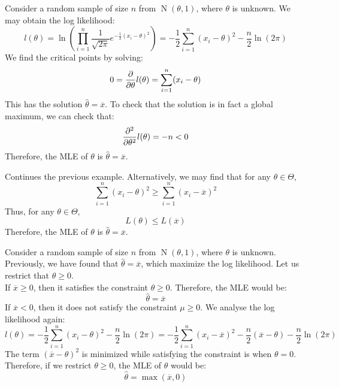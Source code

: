 \documentclass{huhtakm-template-book-v2}
\DeclareMathOperator{\N}{N}
\begin{document}
\newpage
\begin{eg}
	Consider a random sample of size $n$ from $\N(\theta,1)$, where $\theta$ is unknown. We may obtain the log likelihood:
	\begin{equation*}
		l(\theta)=\ln\left(\prod_{i=1}^{n}\frac{1}{\sqrt{2\pi}}e^{-\frac{1}{2}(x_{i}-\theta)^{2}}\right)=-\frac{1}{2}\sum_{i=1}^{n}(x_{i}-\theta)^{2}-\frac{n}{2}\ln(2\pi)
	\end{equation*}
	We find the critical points by solving:
	\begin{equation*}
		0=\pdv*{l(\theta)}{\theta}=\sum_{i=1}^{n}(x_{i}-\theta)
	\end{equation*}
	This has the solution $\hat{\theta}=\overline{x}$. To check that the solution is in fact a global maximum, we can check that:
	\begin{equation*}
		\pdv*[order={2}]{l(\theta)}{\theta}=-n<0
	\end{equation*}
	Therefore, the MLE of $\theta$ is $\hat{\theta}=\overline{x}$.
\end{eg}
\begin{eg}
	Continues the previous example. Alternatively, we may find that for any $\theta\in\Theta$,
	\begin{equation*}
		\sum_{i=1}^{n}(x_{i}-\theta)^{2}\geq\sum_{i=1}^{n}(x_{i}-\overline{x})^{2}
	\end{equation*}
	Thus, for any $\theta\in\Theta$,
	\begin{equation*}
		L(\theta)\leq L(\overline{x})
	\end{equation*}
	Therefore, the MLE of $\theta$ is $\hat{\theta}=\overline{x}$.
\end{eg}
\begin{eg}
	Consider a random sample of size $n$ from $\N(\theta,1)$, where $\theta$ is unknown. Previously, we have found that $\hat{\theta}=\overline{x}$, which maximize the log likelihood. Let us restrict that $\theta\geq 0$.\\
	If $\overline{x}\geq 0$, then it satisfies the constraint $\theta\geq 0$. Therefore, the MLE would be:
	\begin{equation*}
		\hat{\theta}=\overline{x}
	\end{equation*}
	If $\overline{x}<0$, then it does not satisfy the constraint $\mu\geq 0$. We analyse the log likelihood again:
	\begin{equation*}
		l(\theta)=-\frac{1}{2}\sum_{i=1}^{n}(x_{i}-\theta)^{2}-\frac{n}{2}\ln(2\pi)=-\frac{1}{2}\sum_{i=1}^{n}(x_{i}-\overline{x})^{2}-\frac{n}{2}(\overline{x}-\theta)-\frac{n}{2}\ln(2\pi)
	\end{equation*}
	The term $(\overline{x}-\theta)^{2}$ is minimized while satisfying the constraint is when $\theta=0$.\\
	Therefore, if we restrict $\theta\geq 0$, the MLE of $\theta$ would be:
	\begin{equation*}
		\hat{\theta}=\max(\overline{x},0)
	\end{equation*}
\end{eg}
\end{document}
